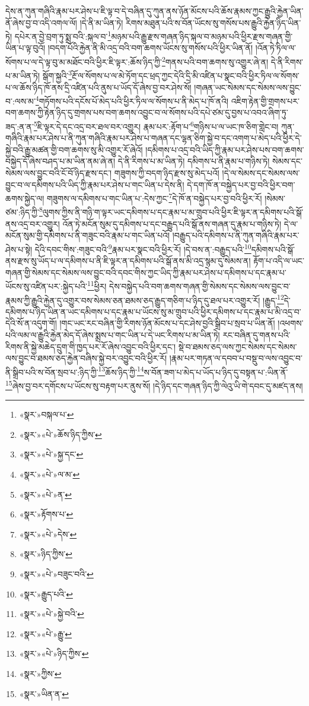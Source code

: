 དེས་ན་ཀུན་གཞིའི་རྣམ་པར་ཤེས་པ་ཇི་ལྟ་བ་དེ་བཞིན་དུ་ཀུན་ནས་ཉོན་མོངས་པའི་ཆོས་རྣམས་ཀྱང་རྒྱུའི་རྐྱེན་ཡིན་ནོ་ཞེས་བྱ་བ་འདི་འགལ་ལོ། །དེ་ནི་མ་ཡིན་ཏེ། རིགས་མཐུན་པའི་ས་བོན་ཡོངས་སུ་གསོས་པས་རྒྱུའི་རྐྱེན་ཉིད་ཡིན་ཏེ། དཔེར་ན་བྱེ་བྲག་ཏུ་སྨྲ་བའི་:སྐལ་བ་\footnote{«སྣར་»བསྐལ་པ་}མཉམ་པའི་རྒྱུ་རྫས་གཞན་ཉིད་སྐལ་བ་མཉམ་པའི་ཕྱིར་རྫས་གཞན་གྱི་ཡིན་པ་ལྟ་བུའོ། །བདག་པོའི་རྐྱེན་ནི་མི་འདྲ་བའི་བག་ཆགས་ཡོངས་སུ་གསོས་པའི་ཕྱིར་ཡིན་ནོ། །འོན་ཏེ་ཏིལ་ལ་སོགས་པ་ལ་དེ་ལྟ་བུ་མ་མཐོང་བའི་ཕྱིར་ཇི་ལྟར་:ཆོས་ཉིད་ཀྱི་\footnote{«སྣར་»«པེ་»ཆོས་ཉིད་ཀྱིས་}གནས་པའི་བག་ཆགས་སུ་འགྱུར་ཞེ་ན། དེ་ནི་རིགས་པ་མ་ཡིན་ཏེ། སྒོག་སྐྱའི་\footnote{«སྣར་»«པེ་»སྐྱ་དང་}རྔོ་ལ་སོགས་པ་ལ་མེ་ཏོག་དང་ཕྲད་ཀྱང་དེའི་དྲི་མི་འཛིན་པ་སྣང་བའི་ཕྱིར་ཏིལ་ལ་སོགས་པ་ལ་ཆོས་ཉིད་ཁོ་ནས་དྲི་འཛིན་པའི་ནུས་པ་ཡོད་དོ་ཞེས་བྱ་བར་ཤེས་སོ། །གཞན་ཡང་སེམས་དང་སེམས་ལས་བྱུང་བ་:ལས་མ་\footnote{«སྣར་»«པེ་»ལ་མ་}གཏོགས་པའི་དངོས་པོ་མེད་པའི་ཕྱིར་ཏིལ་ལ་སོགས་པ་ནི་མེད་པ་ཁོ་ནའི། འཇིག་རྟེན་གྱི་གྲགས་པར་བག་ཆགས་ཀྱི་རྟེན་ཉིད་དུ་གྲགས་པས་བག་ཆགས་འབྱུང་བ་ལ་སོགས་པའི་དཔེ་ཙམ་དུ་བྱས་པ་འབའ་ཞིག་ཏུ་ཟད་:ན་ན་\footnote{«སྣར་»«པེ་»ན་}ཇི་ལྟར་དེ་དང་འདྲ་བར་ཐལ་བར་འགྱུར། རྣམ་པར་:རྟོག་པ་\footnote{«སྣར་»རྟོགས་པ་}གཉིས་པ་ལ་ཡང་ཁ་ཅིག་གླེང་བ། ཀུན་གཞིའི་རྣམ་པར་ཤེས་པ་ནི་ཀུན་གཞིའི་རྣམ་པར་ཤེས་པ་གཞན་དང་ལྷན་ཅིག་སྐྱེ་བ་དང་འགག་པ་མེད་པའི་ཕྱིར་དེ་སྐྱེ་བའི་རྒྱུ་མཚན་གྱི་བག་ཆགས་སུ་མི་འགྱུར་རོ་ཞེའོ། །དམིགས་པ་འདྲ་བའི་ཡིད་ཀྱི་རྣམ་པར་ཤེས་པས་བག་ཆགས་བསྐྱེད་དོ་ཞེས་བཤད་པ་མ་ཡིན་ནམ་ཞེ་ན། དེ་ནི་རིགས་པ་མ་ཡིན་ཏེ། དམིགས་པ་ནི་རྣམ་པ་གཉིས་ཏེ། སེམས་དང་སེམས་ལས་བྱུང་བའི་ངོ་བོ་ཉིད་རྫས་དང་། གཟུགས་ཀྱི་བདག་ཉིད་རྫས་སུ་མེད་པའོ། །དེ་ལ་སེམས་དང་སེམས་ལས་བྱུང་བ་ལ་དམིགས་པའི་ཡིད་ཀྱི་རྣམ་པར་ཤེས་པ་གང་ཡིན་པ་དེས་ནི། དེ་དག་ཁོ་ན་བསྐྱེད་པར་བྱ་བའི་ཕྱིར་བག་ཆགས་སྐྱེད་ལ། གཟུགས་ལ་དམིགས་པ་གང་ཡིན་པ་:དེས་ཀྱང་\footnote{«སྣར་»«པེ་»དེས་}དེ་ཁོ་ན་བསྐྱེད་པར་བྱ་བའི་ཕྱིར་རོ། །སེམས་ཙམ་:ཉིད་ཀྱི་\footnote{«སྣར་»ཉིད་ཀྱིས་}ལུགས་ཀྱིས་ནི་གཉི་ག་ལྟར་ཡང་དམིགས་པ་དང་རྣམ་པ་མ་གྲུབ་པའི་ཕྱིར་ཇི་ལྟར་ན་དམིགས་པའི་སྒོ་ནས་འདྲ་བར་འགྱུར། འོན་ཏེ་མངོན་སུམ་དུ་དམིགས་པ་དང་བརྒྱུད་པའི་སྒོ་ནས་གཞན་དུ་རྣམ་པ་གཉིས་ཏེ། དེ་ལ་མངོན་སུམ་གྱི་དམིགས་པ་ནི་གཟུང་བའི་རྣམ་པ་གང་ཡིན་པའོ། །བརྒྱུད་པའི་དམིགས་པ་ནི་ཀུན་གཞིའི་རྣམ་པར་ཤེས་པ་སྟེ། དེའི་དབང་གིས་:གཟུང་བའི་\footnote{«སྣར་»«པེ་»བཟུང་བའི་}རྣམ་པར་སྣང་བའི་ཕྱིར་རོ། །དེ་བས་ན་:བརྒྱུད་པའི་\footnote{«སྣར་»རྒྱུད་པའི་}དམིགས་པའི་སྒོ་ནས་རྫས་སུ་ཡོད་པ་ལ་དམིགས་པ་ནི་ཇི་ལྟར་ན་དམིགས་པའི་སྒོ་ནས་མི་འདྲ་སྙམ་དུ་སེམས་ན། རྟོག་པ་འདི་ལ་ཡང་གཞན་གྱི་སེམས་དང་སེམས་ལས་བྱུང་བའི་དབང་གིས་ཀྱང་ཡིད་ཀྱི་རྣམ་པར་ཤེས་པ་དམིགས་པ་དང་རྣམ་པ་ཡོངས་སུ་འཛིན་པར་:སྐྱེད་པའི་\footnote{«སྣར་»«པེ་»སྐྱེ་བའི་}ཕྱིར། དེས་བསྐྱེད་པའི་བག་ཆགས་གཞན་གྱི་སེམས་དང་སེམས་ལས་བྱུང་བ་རྣམས་ཀྱི་རྒྱུའི་རྐྱེན་དུ་འགྱུར་བས་སེམས་ཅན་ཐམས་ཅད་རྒྱུད་གཅིག་པ་ཉིད་དུ་ཐལ་པར་འགྱུར་རོ། །རྒྱུད་\footnote{«སྣར་»«པེ་»རྒྱུ་}དེ་དམིགས་པ་ཉིད་ཡིན་ན་ཡང་དམིགས་པ་དང་རྣམ་པ་ཡོངས་སུ་མ་གྲུབ་པའི་ཕྱིར་དམིགས་པ་དང་རྣམ་པ་མི་འདྲ་བ་དེའི་སོ་ན་འདུག་གོ། །གང་ཡང་རང་བཞིན་གྱི་རིགས་ཉོན་མོངས་པ་དང་ཤེས་བྱའི་སྒྲིབ་པ་སྲབ་པ་ཡིན་ནོ། །འཕགས་པའི་ལམ་ལ་རྒྱུའི་རྐྱེན་མེད་དོ་ཞེས་སྨྲས་པ་གང་ཡིན་པ་དེ་ཡང་རིགས་པ་མ་ཡིན་ཏེ། རང་བཞིན་དུ་གནས་པའི་རིགས་ནི་སྐྱེ་མཆེད་དྲུག་གི་ཁྱད་པར་རོ་ཞེས་འབྱུང་བའི་ཕྱིར་དང་། སྡེ་བ་ཐམས་ཅད་ལས་ཀྱང་སེམས་དང་སེམས་ལས་བྱུང་བ་ཐམས་ཅད་རྐྱེན་བཞིས་སྐྱེ་བར་འབྱུང་བའི་ཕྱིར་རོ། །རྣམ་པར་གཏན་ལ་དབབ་པ་བསྡུ་བ་ལས་འབྱུང་བ་ནི་སྒྲིབ་པའི་ས་བོན་སྲབ་པ་:ཉིད་ཀྱི་\footnote{«སྣར་»«པེ་»ཉིད་ཀྱིས་}ཆོས་ཉིད་ཀྱི་\footnote{«སྣར་»ཀྱིས་}ས་བོན་ཟག་པ་མེད་པ་ཡོད་པ་ཉིད་དུ་བསྟན་པ་:ཡིན་ནོ་\footnote{«སྣར་»ཡིན་ན་}ཞེས་བྱ་བར་དགོངས་པ་ཡོངས་སུ་བརྟག་པར་ནུས་སོ། །དེ་ཉིད་དང་གཞན་ཉིད་ཀྱི་ལེའུ་ཡི་གེ་དབང་དུ་མཛད་ནས། 